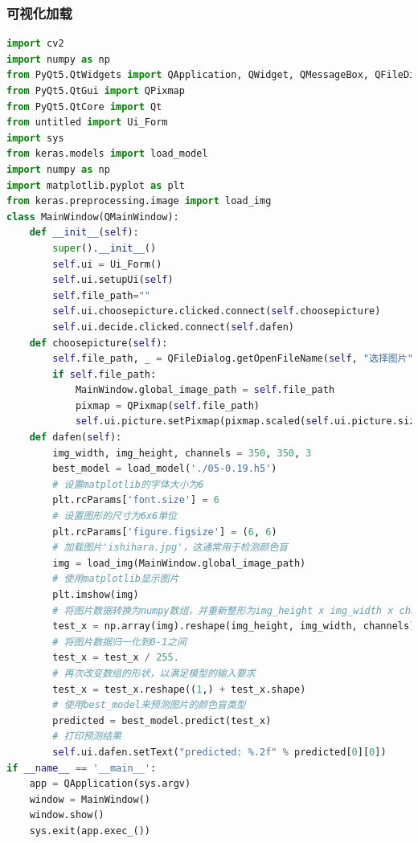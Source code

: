 \documentclass{article}
\begin{document}
\subsubsection{可视化加载}
\begin{lstlisting}[language=python]
import cv2
import numpy as np
from PyQt5.QtWidgets import QApplication, QWidget, QMessageBox, QFileDialog, QLabel,QMainWindow
from PyQt5.QtGui import QPixmap
from PyQt5.QtCore import Qt
from untitled import Ui_Form
import sys
from keras.models import load_model
import numpy as np
import matplotlib.pyplot as plt
from keras.preprocessing.image import load_img
class MainWindow(QMainWindow):
    def __init__(self):
        super().__init__()
        self.ui = Ui_Form()
        self.ui.setupUi(self)
        self.file_path=""
        self.ui.choosepicture.clicked.connect(self.choosepicture)
        self.ui.decide.clicked.connect(self.dafen)
    def choosepicture(self):
        self.file_path, _ = QFileDialog.getOpenFileName(self, "选择图片", "", "Images (*.png *.jpg)")
        if self.file_path:
            MainWindow.global_image_path = self.file_path
            pixmap = QPixmap(self.file_path)
            self.ui.picture.setPixmap(pixmap.scaled(self.ui.picture.size()))
    def dafen(self):
        img_width, img_height, channels = 350, 350, 3
        best_model = load_model('./05-0.19.h5')
        # 设置matplotlib的字体大小为6
        plt.rcParams['font.size'] = 6
        # 设置图形的尺寸为6x6单位
        plt.rcParams['figure.figsize'] = (6, 6)
        # 加载图片'ishihara.jpg'，这通常用于检测颜色盲
        img = load_img(MainWindow.global_image_path)
        # 使用matplotlib显示图片
        plt.imshow(img)
        # 将图片数据转换为numpy数组，并重新整形为img_height x img_width x channels的形状
        test_x = np.array(img).reshape(img_height, img_width, channels)
        # 将图片数据归一化到0-1之间
        test_x = test_x / 255.
        # 再次改变数组的形状，以满足模型的输入要求
        test_x = test_x.reshape((1,) + test_x.shape)
        # 使用best_model来预测图片的颜色盲类型
        predicted = best_model.predict(test_x)
        # 打印预测结果
        self.ui.dafen.setText("predicted: %.2f" % predicted[0][0])
if __name__ == '__main__':
    app = QApplication(sys.argv)
    window = MainWindow()
    window.show()
    sys.exit(app.exec_())
\end{lstlisting}
\end{document}
